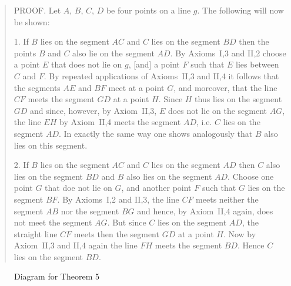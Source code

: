 \begin{quote}
PROOF. Let $A$, $B$, $C$, $D$ be four points on a line $g$. The following will now be shown:

1. If $B$ lies on the segment $AC$ and $C$ lies on the segment $BD$ then the points $B$ and $C$ also lie on the segment $AD$. By Axioms~I,3 and II,2 choose a point $E$ that does not lie on $g$, [and] a point $F$ such that $E$ lies between $C$ and $F$. By repeated applications of Axioms~II,3 and II,4 it follows that the segments $AE$ and $BF$ meet at a point $G$, and moreover, that the line $CF$ meets the segment $GD$ at a point $H$. Since $H$ thus lies on the segment $GD$ and since, however, by Axiom~II,3, $E$ does not lie on the segment $AG$, the line $EH$ by Axiom~II,4 meets the segment $AD$, i.e. $C$ lies on the segment $AD$. In exactly the same way one shows analogously that $B$ also lies on this segment.

2. If $B$ lies on the segment $AC$ and $C$ lies on the segment $AD$ then $C$ also lies on the segment $BD$ and $B$ also lies on the segment $AD$. Choose one point $G$ that doe not lie on $G$, and another point $F$ such that $G$ lies on the segment $BF$. By Axioms~I,2 and II,3, the line $CF$ meets neither the segment $AB$ nor the segment $BG$ and hence, by Axiom~II,4 again, does not meet the segment $AG$. But since $C$ lies on the segment $AD$, the straight line $CF$ meets then the segment $GD$ at a point $H$. Now by Axiom~II,3 and II,4 again the line $FH$ meets the segment $BD$. Hence $C$ lies on the segment $BD$.
\end{quote}

\begin{figure}
\caption{Diagram for Theorem 5}
\label{fig:Theorem5Diagram}
\end{figure}

